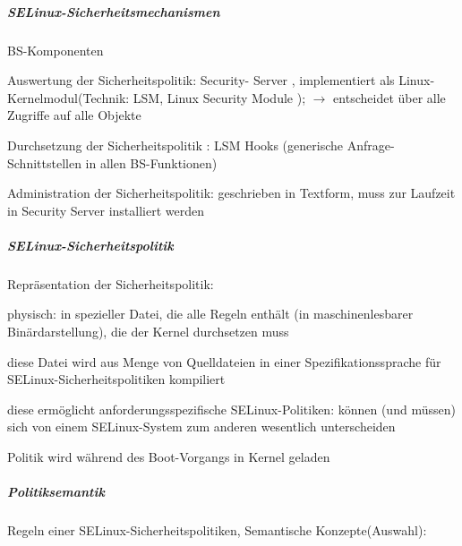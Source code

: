 \documentclass[a4paper]{article}
\begin{document}
\begin{multicols}{3}
    \subparagraph{SELinux-Sicherheitsmechanismen}

    BS-Komponenten

    \begin{itemize*}
        \item
        Auswertung der Sicherheitspolitik: Security- Server , implementiert
        als Linux-Kernelmodul(Technik: LSM, Linux Security Module );
        $\rightarrow$  entscheidet über alle Zugriffe auf alle
        Objekte
        \item
        Durchsetzung der Sicherheitspolitik : LSM Hooks (generische
        Anfrage-Schnittstellen in allen BS-Funktionen)
        \item
        Administration der Sicherheitspolitik: geschrieben in Textform, muss
        zur Laufzeit in Security Server installiert werden
    \end{itemize*}




    \subparagraph{SELinux-Sicherheitspolitik}

    Repräsentation der Sicherheitspolitik:

    \begin{itemize*}
        \item
        physisch: in spezieller Datei, die alle Regeln enthält (in
        maschinenlesbarer Binärdarstellung), die der Kernel durchsetzen muss
        \item
        diese Datei wird aus Menge von Quelldateien in einer
        Spezifikationssprache für SELinux-Sicherheitspolitiken kompiliert
        \item
        diese ermöglicht anforderungsspezifische SELinux-Politiken: können
        (und müssen) sich von einem SELinux-System zum anderen wesentlich
        unterscheiden
        \item
        Politik wird während des Boot-Vorgangs in Kernel geladen
    \end{itemize*}


    \subparagraph{Politiksemantik}

    Regeln einer SELinux-Sicherheitspolitiken, Semantische
    Konzepte(Auswahl):


\end{multicols}
\end{document}
